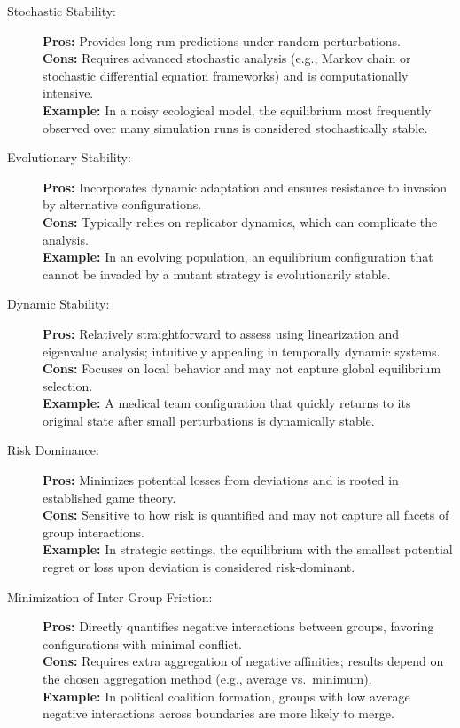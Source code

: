 \documentclass{article}
\begin{document}
\begin{description}
  \item[Stochastic Stability:] 
    \textbf{Pros:} Provides long-run predictions under random perturbations.\\
    \textbf{Cons:} Requires advanced stochastic analysis (e.g., Markov chain or stochastic differential equation frameworks) and is computationally intensive.\\
    \textbf{Example:} In a noisy ecological model, the equilibrium most frequently observed over many simulation runs is considered stochastically stable.
    
  \item[Evolutionary Stability:] 
    \textbf{Pros:} Incorporates dynamic adaptation and ensures resistance to invasion by alternative configurations.\\
    \textbf{Cons:} Typically relies on replicator dynamics, which can complicate the analysis.\\
    \textbf{Example:} In an evolving population, an equilibrium configuration that cannot be invaded by a mutant strategy is evolutionarily stable.
    
  \item[Dynamic Stability:] 
    \textbf{Pros:} Relatively straightforward to assess using linearization and eigenvalue analysis; intuitively appealing in temporally dynamic systems.\\
    \textbf{Cons:} Focuses on local behavior and may not capture global equilibrium selection.\\
    \textbf{Example:} A medical team configuration that quickly returns to its original state after small perturbations is dynamically stable.
    
  \item[Risk Dominance:] 
    \textbf{Pros:} Minimizes potential losses from deviations and is rooted in established game theory.\\
    \textbf{Cons:} Sensitive to how risk is quantified and may not capture all facets of group interactions.\\
    \textbf{Example:} In strategic settings, the equilibrium with the smallest potential regret or loss upon deviation is considered risk-dominant.
    
  \item[Minimization of Inter-Group Friction:] 
    \textbf{Pros:} Directly quantifies negative interactions between groups, favoring configurations with minimal conflict.\\
    \textbf{Cons:} Requires extra aggregation of negative affinities; results depend on the chosen aggregation method (e.g., average vs.\ minimum).\\
    \textbf{Example:} In political coalition formation, groups with low average negative interactions across boundaries are more likely to merge.
    

\end{description}
\end{document}
